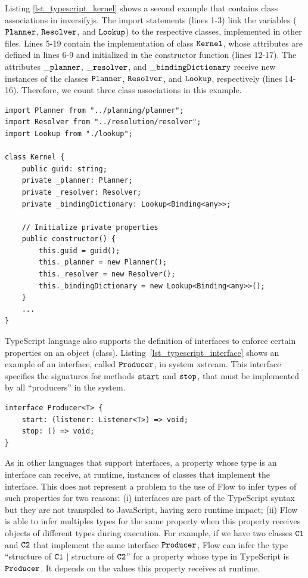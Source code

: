 \documentclass[review]{elsarticle}
\newcommand{\aspas}[1]{{``#1''}}
\newcommand{\mcode}[1]{$\tt #1$}
\begin{document}
Listing \ref{lst_typescript_kernel} shows a second example that contains class associations in {\sc inversifyjs}. The import statements (lines 1-3) link the variables (\mcode{Planner}, \mcode{Resolver}, and \mcode{Lookup}) to the respective classes, implemented in other files. Lines 5-19 contain the implementation of class \mcode{Kernel}, whose attributes are defined in lines 6-9 and initialized in the constructor function (lines 12-17). The attributes \mcode{\_planner}, \mcode{\_resolver}, and \mcode{\_bindingDictionary} receive new instances of the classes \mcode{Planner}, \mcode{Resolver}, and \mcode{Lookup}, respectively (lines 14-16). Therefore, we count three class associations in this example.

\begin{lstlisting}[caption=Example of class associations in TypeScript, label=lst_typescript_kernel, basicstyle=\ttfamily\footnotesize, emph={[2]},emphstyle={[2]\ttfamily\bfseries\color{darkgreen}}]
import Planner from "../planning/planner";
import Resolver from "../resolution/resolver";
import Lookup from "./lookup";

class Kernel {
	public guid: string;
	private _planner: Planner;
	private _resolver: Resolver;
	private _bindingDictionary: Lookup<Binding<any>>;

	// Initialize private properties
	public constructor() {
		this.guid = guid();
		this._planner = new Planner();
		this._resolver = new Resolver();
		this._bindingDictionary = new Lookup<Binding<any>>();
	}
	...
}
\end{lstlisting} 

TypeScript language also supports the definition of interfaces to enforce certain properties on an object (class).
Listing~\ref{lst_typescript_interface} shows an example of an interface, called \mcode{Producer}, in system {\sc xstream}. This interface specifies the signatures for methods \mcode{start} and \mcode{stop}, that must be implemented by all \aspas{producers} in the system. 

\begin{lstlisting}[caption=Example of interface in TypeScript, label=lst_typescript_interface, basicstyle=\ttfamily\footnotesize, emph={[2]string,boolean},emphstyle={[2]\ttfamily\bfseries\color{darkgreen}}]
interface Producer<T> {
	start: (listener: Listener<T>) => void;
	stop: () => void;
}
\end{lstlisting} 

As in other languages that support interfaces, a property whose type is an interface can receive, at runtime, instances of classes that implement the interface. This does not represent a problem to the use of Flow to infer types of such properties for two reasons: (i) interfaces are part of the TypeScript syntax but they are not transpiled to JavaScript, having zero runtime impact; (ii) Flow is able to infer multiples types for the same property when this property receives objects of different types during execution. For example, if we have two classes \mcode{C1} and \mcode{C2} that implement the same interface \mcode{Producer}, Flow can infer the type \aspas{structure of \mcode{C1} $|$ structure of \mcode{C2}} for a property whose type in TypeScript is \mcode{Producer}. It depends on the values this property receives at runtime.
\end{document}

